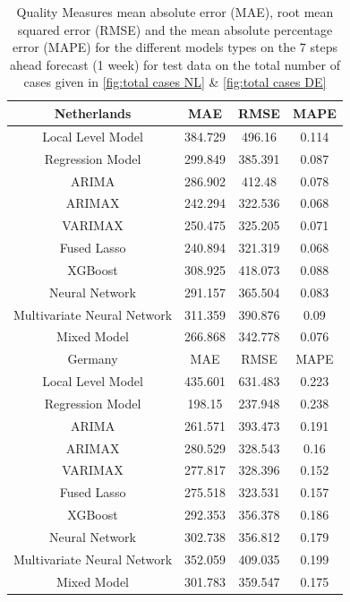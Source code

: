 \begin{table}[]
    \centering
    \begin{tabular}{|c|c c c|}\hline
        Netherlands & MAE & RMSE & MAPE\\\hline
        Local Level Model & 384.729  & 496.16 & 0.114\\
        Regression Model & 299.849 & 385.391 & 0.087\\
        ARIMA & 286.902 & 412.48 & 0.078\\
        ARIMAX & 242.294 & 322.536 & 0.068\\
        VARIMAX & 250.475 & 325.205 & 0.071\\
        Fused Lasso & 240.894 & 321.319 & 0.068\\
        XGBoost & 308.925 & 418.073 & 0.088\\
        Neural Network & 291.157 & 365.504 & 0.083\\
        Multivariate Neural Network & 311.359 & 390.876 & 0.09\\
        Mixed Model & 266.868 & 342.778 & 0.076\\\hline\hline
        Germany & MAE & RMSE & MAPE\\\hline
        Local Level Model & 435.601 & 631.483 & 0.223\\
        Regression Model & 198.15 & 237.948 & 0.238\\
        ARIMA & 261.571 & 393.473 & 0.191\\
        ARIMAX & 280.529 & 328.543 & 0.16\\
        VARIMAX & 277.817 & 328.396 & 0.152\\
        Fused Lasso & 275.518 & 323.531 & 0.157\\
        XGBoost & 292.353 & 356.378 & 0.186\\
        Neural Network & 302.738 & 356.812 & 0.179\\
        Multivariate Neural Network & 352.059 & 409.035 & 0.199\\
        Mixed Model & 301.783 & 359.547 & 0.175\\\hline  
    \end{tabular}
    \caption{Quality Measures mean absolute error (MAE), root mean squared error (RMSE) and the mean absolute percentage error (MAPE) for the different models types on the 7 steps ahead forecast (1 week) for test data on the total number of cases given in \autoref{fig:total cases NL} \& \ref{fig:total cases DE}}
    \label{tab:1 week ahead}
\end{table}

